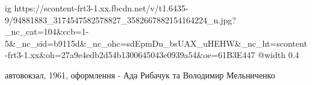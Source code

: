  
 
 
 
 

\ifcmt
  ig https://scontent-frt3-1.xx.fbcdn.net/v/t1.6435-9/94881883_3174547582578827_3582667882154164224_n.jpg?_nc_cat=104&ccb=1-5&_nc_sid=b9115d&_nc_ohc=sdEpmDu_bsUAX_uHEHW&_nc_ht=scontent-frt3-1.xx&oh=27a9e4edb2d54b1300645043e0939a54&oe=61B3E447
  @width 0.4
\fi

автовокзал, 1961, оформлення - Ада Рибачук та Володимир Мельниченко
